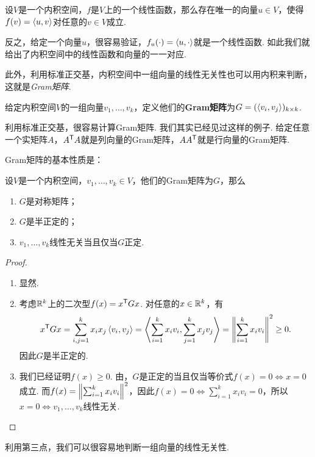 \begin{theorem}[Riesz表示定理]\label{thm:riesz}
设$V$是一个内积空间，$f$是$V$上的一个线性函数，那么存在唯一的向量$u\in V$，使得$f(v)=\left\langle{u},{v}\right\rangle$对任意的$v\in V$成立.
\end{theorem}

反之，给定一个向量$u$，很容易验证，$f_u(\cdot)=\left\langle{u},{\cdot}\right\rangle$就是一个线性函数. 如此我们就给出了内积空间中的线性函数和向量的一一对应. 

此外，利用标准正交基，内积空间中一组向量的线性无关性也可以用内积来判断，这就是\emph{Gram矩阵}. 

\begin{definition}[Gram矩阵]\label{def:gram-matrix}
给定内积空间$V$的一组向量$v_1,\dots,v_k$，定义他们的\textbf{Gram矩阵}为$G=(\left\langle{v_i},{v_j}\right\rangle)_{k\times k}$. 
\end{definition}

利用标准正交基，很容易计算Gram矩阵. 我们其实已经见过这样的例子. 给定任意一个实矩阵$A$，$A^{\mathsf{T}} A$就是列向量的Gram矩阵，$AA^{\mathsf{T}}$就是行向量的Gram矩阵.

Gram矩阵的基本性质是：

\begin{proposition}\label{prop:gram}
设$V$是一个内积空间，$v_1,\dots,v_k\in V$，他们的Gram矩阵为$G$，那么
\begin{enumerate}
    \item $G$是对称矩阵；
    \item $G$是半正定的；
    \item $v_1,\dots,v_k$线性无关当且仅当$G$正定.
\end{enumerate}
\end{proposition}
\begin{proof}
\begin{enumerate}
    \item 显然.
    \item 考虑$\mathbb{R}^k$上的二次型$f(x)=x^{\mathsf{T}} Gx$. 对任意的$x\in\mathbb{R}^k$，有
    \[
        x^{\mathsf{T}} G x=\sum_{i,j=1}^kx_ix_j\left\langle{v_i},{v_j}\right\rangle
        =\left\langle{\sum_{i=1}^kx_iv_i},{\sum_{j=1}^kx_jv_j}\right\rangle
        =\left\|\sum_{i=1}^kx_iv_i\right\|^2\geq 0.
    \]
    因此$G$是半正定的.
    \item 我们已经证明$f(x)\geq 0$. 由，$G$是正定的当且仅当等价式$f(x)=0\iff x=0$成立. 而$f(x)=\left\|\sum_{i=1}^kx_iv_i\right\|^2$，因此$f(x)=0\iff \sum_{i=1}^kx_iv_i=0$，所以$x=0\iff v_1,\dots,v_k$线性无关.
\end{enumerate}
\end{proof}

利用第三点，我们可以很容易地判断一组向量的线性无关性. 

